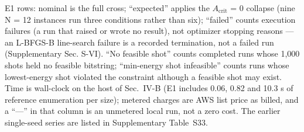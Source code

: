 \documentclass{ieeeaccess}
\begin{document}
E1 rows: nominal is the full cross; ``expected'' applies the $A_{\mathrm{crit}}$ = 0 collapse (nine N = 12 instances run three conditions rather than six); ``failed'' counts execution failures (a run that raised or wrote no result), not optimizer stopping reasons --- an L-BFGS-B line-search failure is a recorded termination, not a failed run (Supplementary Sec. S-VI). ``No feasible shot'' counts completed runs whose 1,000 shots held no feasible bitstring; ``min-energy shot infeasible'' counts runs whose lowest-energy shot violated the constraint although a feasible shot may exist. Time is wall-clock on the host of Sec.~IV-B (E1 includes 0.06, 0.82 and 10.3 s of reference enumeration per size); metered charges are AWS list price as billed, and a ``---'' in that column is an unmetered local run, not a zero cost. The earlier single-seed series are listed in Supplementary Table~S33.
\end{document}
